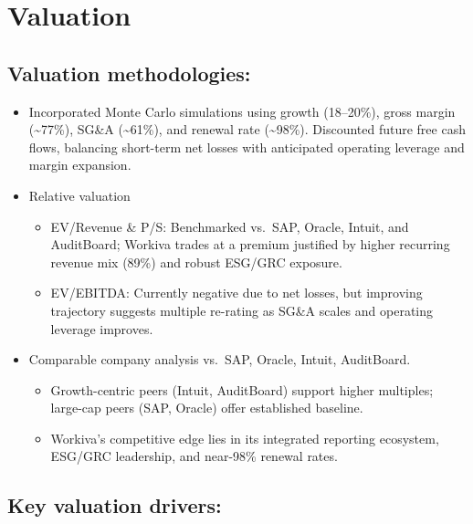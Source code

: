 \documentclass[
  10pt,
  a4paper,
]{article}
\providecommand{\tightlist}{%
  \setlength{\itemsep}{0pt}\setlength{\parskip}{0pt}}\usepackage{longtable,booktabs,array}
\begin{document}
\section{Valuation}\label{valuation}

\subsection{Valuation methodologies:}\label{valuation-methodologies}

\begin{itemize}
\tightlist
\item
  Incorporated Monte Carlo simulations using growth (18--20\%), gross
  margin (\textasciitilde77\%), SG\&A (\textasciitilde61\%), and renewal
  rate (\textasciitilde98\%). Discounted future free cash flows,
  balancing short-term net losses with anticipated operating leverage
  and margin expansion.
\item
  Relative valuation

  \begin{itemize}
  \tightlist
  \item
    EV/Revenue \& P/S: Benchmarked vs.~SAP, Oracle, Intuit, and
    AuditBoard; Workiva trades at a premium justified by higher
    recurring revenue mix (89\%) and robust ESG/GRC exposure.
  \item
    EV/EBITDA: Currently negative due to net losses, but improving
    trajectory suggests multiple re-rating as SG\&A scales and operating
    leverage improves.
  \end{itemize}
\item
  Comparable company analysis vs.~SAP, Oracle, Intuit, AuditBoard.

  \begin{itemize}
  \tightlist
  \item
    Growth-centric peers (Intuit, AuditBoard) support higher multiples;
    large-cap peers (SAP, Oracle) offer established baseline.
  \item
    Workiva's competitive edge lies in its integrated reporting
    ecosystem, ESG/GRC leadership, and near-98\% renewal rates.
  \end{itemize}
\end{itemize}

\subsection{Key valuation drivers:}\label{key-valuation-drivers}
\end{document}
